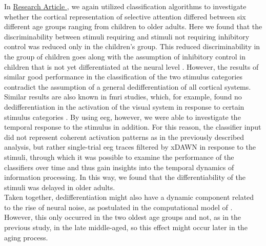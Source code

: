 In \hyperref[results:paperII]{Research Article }, we again utilized classification algorithms to investigate whether the cortical representation of selective attention differed between six different age groups ranging from children to older adults. Here we found that the discriminability between stimuli requiring and stimuli not requiring inhibitory control was reduced only in the children's group. This reduced discriminability in the group of children goes along with the assumption of inhibitory control in children that is not yet differentiated at the neural level \cite{Waszak2010, Reuter2019}. However, the results of similar good performance in the classification of the two stimulus categories contradict the assumption of a general dedifferentiation of all cortical systems. Similar results are also known in \gls{fmri} studies, which, for example, found no dedifferentiation in the activation of the visual system in response to certain stimulus categories \cite{Voss2008}. By using \gls{eeg}, however, we were able to investigate the temporal response to the stimulus in addition. For this reason, the classifier input did not represent coherent activation patterns as in the previously described analysis, but rather single-trial \gls{eeg} traces filtered by xDAWN in response to the stimuli, through which it was possible to examine the performance of the classifiers over time and thus gain insights into the temporal dynamics of information processing. In this way, we found that the differentiability of the stimuli was delayed in older adults.\\
Taken together, dedifferentiation might also have a dynamic component related to the rise of neural noise, as postulated in the computational model of \citeauthor{Li2001} \cite{Li2001, Li2000}. However, this only occurred in the two oldest age groups and not, as in the previous study, in the late middle-aged, so this effect might occur later in the aging process.

